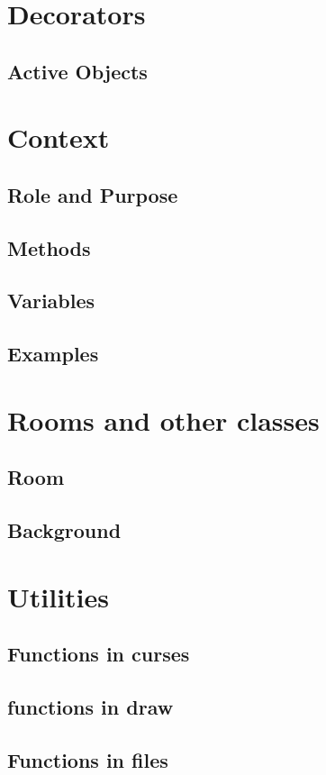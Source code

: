 





\chapter{Decorators}
	\section{Active Objects}
	
	
\chapter{Context}
	\section{Role and Purpose}
	
	
	\section{Methods}
	
	
	\section{Variables}
	
	
	\section{Examples}

\chapter{Rooms and other classes}
	\section{Room}
	
	
	\section{Background}
	
	
\chapter{Utilities}
	\section{Functions in curses}
	
	
	\section{functions in draw}
	
	
	\section{Functions in files}
	
	
	
